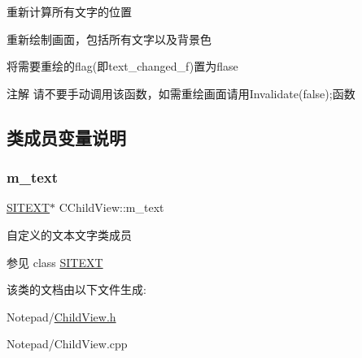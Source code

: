 \begin{DoxyItemize}
\item 重新计算所有文字的位置
\item 重新绘制画面，包括所有文字以及背景色
\item 将需要重绘的flag(即text\+\_\+changed\+\_\+f)置为flase \begin{DoxyNote}{注解}
请不要手动调用该函数，如需重绘画面请用\+Invalidate(false);函数 
\end{DoxyNote}

\end{DoxyItemize}

\subsection{类成员变量说明}
\mbox{\label{class_c_child_view_a7a8d14e1c1adfb50fa6e033ebc05a357}} 
\subsubsection{\texorpdfstring{m\+\_\+text}{m\_text}}
{\footnotesize\ttfamily \hyperlink{class_s_i_t_e_x_t}{S\+I\+T\+E\+XT}$\ast$ C\+Child\+View\+::m\+\_\+text}



自定义的文本文字类成员 

\begin{DoxySeeAlso}{参见}
class \hyperlink{class_s_i_t_e_x_t}{S\+I\+T\+E\+XT} 
\end{DoxySeeAlso}


该类的文档由以下文件生成\+:\begin{DoxyCompactItemize}
\item 
Notepad/\hyperlink{_child_view_8h}{Child\+View.\+h}\item 
Notepad/Child\+View.\+cpp\end{DoxyCompactItemize}
